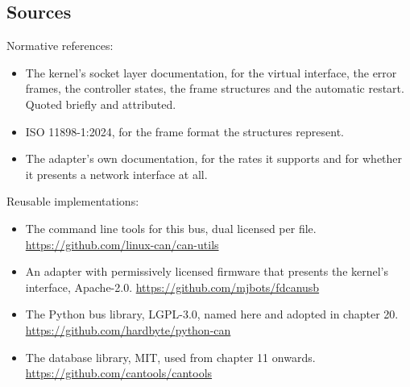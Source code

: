 \subsection*{Sources}

Normative references:
\begin{itemize}
\item The kernel's socket layer documentation, for the virtual interface, the
error frames, the controller states, the frame structures and the automatic
restart. Quoted briefly and attributed.
\item ISO 11898-1:2024, for the frame format the structures represent.
\item The adapter's own documentation, for the rates it supports and for whether
it presents a network interface at all.
\end{itemize}

Reusable implementations:
\begin{itemize}
\item The command line tools for this bus, dual licensed per file.\newline
\url{https://github.com/linux-can/can-utils}
\item An adapter with permissively licensed firmware that presents the kernel's
interface, Apache-2.0.\newline
\url{https://github.com/mjbots/fdcanusb}
\item The Python bus library, LGPL-3.0, named here and adopted in chapter
20.\newline
\url{https://github.com/hardbyte/python-can}
\item The database library, MIT, used from chapter 11 onwards.\newline
\url{https://github.com/cantools/cantools}
\end{itemize}
